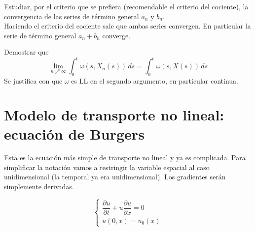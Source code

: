 \begin{ejercicio}\label{ejercicio:ej23} %
    Estudiar, por el criterio que se prefiera (recomendable el criterio del cociente), la convergencia de las series de término general $a_n$
    y $b_n$. \\

    Haciendo el criterio del cociente sale que ambas series convergen. En particular la serie de término general $a_n + b_n$ converge.
\end{ejercicio}

\begin{ejercicio}\label{ejercicio:ej24} %
    Demostrar que 
    $$\lim_{n \nearrow \infty} \int_{0}^{t} \omega(s,X_n(s))\,ds = \int_{0}^{t} \omega(s,X(s))\,ds$$
    Se justifica con que $\omega$ es LL en el segundo argumento, en particular continua.
\end{ejercicio}


\section{Modelo de transporte no lineal: ecuación de Burgers}


Esta es la ecuación más simple de transporte no lineal y ya es complicada. Para simplificar la notación vamos a restringir la variable espacial
al caso unidimensional (la temporal ya era unidimensional). Los gradientes serán simplemente derivadas. 

\begin{equation}\label{eq:ec9}
    \begin{cases}
        \dfrac{\partial u}{\partial t} + u \dfrac{\partial u}{\partial x} = 0 \\
        u(0,x) = u_0(x)
    \end{cases}
\end{equation}

